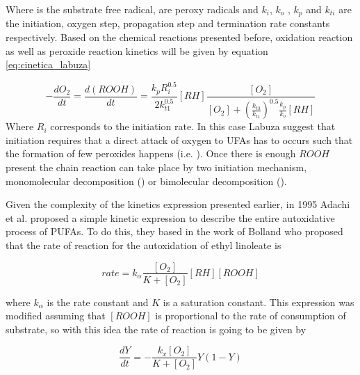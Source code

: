 \begin{refsection}
Where  is the substrate free radical,  are peroxy radicals and $k_i$, $k_o$ , $k_p$ and $k_{ti}$ are the initiation, oxygen step, propagation step and termination rate constants respectively. Based on the chemical reactions presented before, oxidation reaction as well as peroxide reaction kinetics will be given by equation \ref{eq:cinetica_labuza}

\begin{equation}
    -\frac{dO_2}{dt}=\frac{d(ROOH)}{dt}=\frac{k_pR_i^{0.5}}{2k_{t1}^{0.5}} [RH] \frac{[O_2]}{[O_2]+ \left(\frac{k_{t3}}{k_{t1}}\right)^{0.5}\frac{k_p}{k_o}[RH]}
    \label{eq:cinetica_labuza}
\end{equation}
Where $R_i$ corresponds to the initiation rate. In this case Labuza suggest that initiation requires that a direct attack of oxygen to UFAs has to occurs such that the formation of few peroxides happens (i.e. ). Once there is enough $ROOH$ present the chain reaction can take place by two initiation mechanism,  monomolecular decomposition () or bimolecular decomposition (). 

Given the complexity of the kinetics expression presented earlier, in 1995 Adachi et al. \cite{Adachi1995AutoxidationEsters} proposed a simple kinetic expression to describe the entire autoxidative process of PUFAs. To do this, they based in the work of Bolland \cite{Bolland1949KineticsOxidation} who proposed that the rate of reaction for the autoxidation of ethyl linoleate is 

\begin{equation}
    rate=k_\alpha \frac{[O_2]}{K+[O_2]}[RH][ROOH]
\end{equation}

where $k_\alpha$ is the rate constant and $K$ is a saturation constant. This expression was modified assuming that $[ROOH]$ is proportional to the rate of consumption of substrate, so with this idea the rate of reaction is going to be given by 

\begin{equation}
    \frac{dY}{dt}=-\frac{k_x[O_2]}{K+[O_2]}Y(1-Y)
    \label{eq:rate_adachi}
\end{equation}


\end{refsection}
